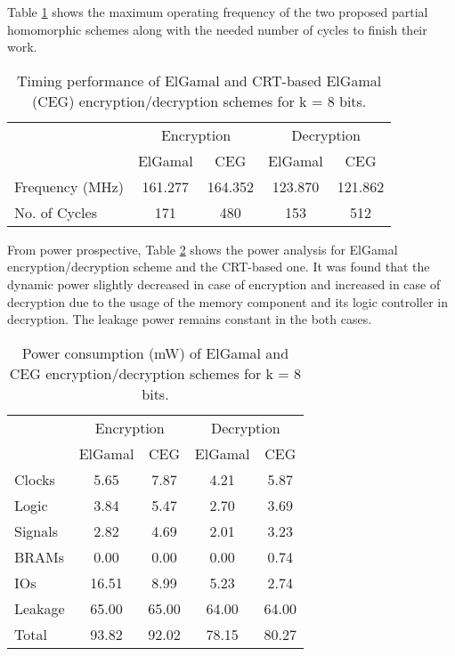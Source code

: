 \documentclass[conference]{IEEEtran}
\begin{document}
Table \ref{tab:PartialTiming} shows the maximum operating frequency of the two proposed partial homomorphic schemes along with the needed number of cycles to finish their work. 

\begin{table}[b]
  \centering
  \caption{Timing performance of ElGamal and CRT-based ElGamal (CEG) encryption/decryption schemes for k = 8 bits.}
    \tabcolsep=0.11cm 
\begin{tabular}{|l||c|c||c|c|}
    \toprule
                  & \multicolumn{2}{c}{Encryption } & \multicolumn{2}{c}{Decryption} \vline\\
                  & ElGamal & CEG     & ElGamal & CEG \\
    \midrule
    Frequency (MHz)& 161.277 & 164.352 & 123.870 & 121.862 \\
    No. of Cycles & 171   & 480   & 153   & 512 \\
\bottomrule 
    \end{tabular}\label{tab:PartialTiming}\end{table}
From power prospective, Table \ref{tab:PartialPower} shows the power analysis for ElGamal encryption/decryption scheme and the CRT-based one. It was found that the dynamic power slightly decreased in case of encryption and increased in case of decryption due to the usage of the memory component and its logic controller in decryption. The leakage power remains constant in the both cases.

\begin{table}[t]
  \centering
  \caption{Power consumption (mW) of ElGamal and CEG encryption/decryption schemes for k = 8 bits.}
    \tabcolsep=0.11cm 
\begin{tabular}{|l||c|c||c|c|}
    \toprule
                  & \multicolumn{2}{c}{Encryption } & \multicolumn{2}{c}{Decryption} \vline\\
                  & ElGamal & CEG     & ElGamal & CEG \\
    \midrule
    Clocks  & 5.65 & 7.87 & 4.21 & 5.87 \\
    Logic   & 3.84 & 5.47 & 2.70 & 3.69 \\
    Signals & 2.82 & 4.69 & 2.01 & 3.23 \\
    BRAMs   & 0.00 & 0.00 & 0.00 & 0.74 \\
    IOs     & 16.51 & 8.99 & 5.23 & 2.74 \\
    Leakage & 65.00 & 65.00 & 64.00 & 64.00 \\
    \midrule
    Total   & 93.82 & 92.02 & 78.15 & 80.27 \\
    \bottomrule 
    \end{tabular}\label{tab:PartialPower}\end{table}
\end{document}
